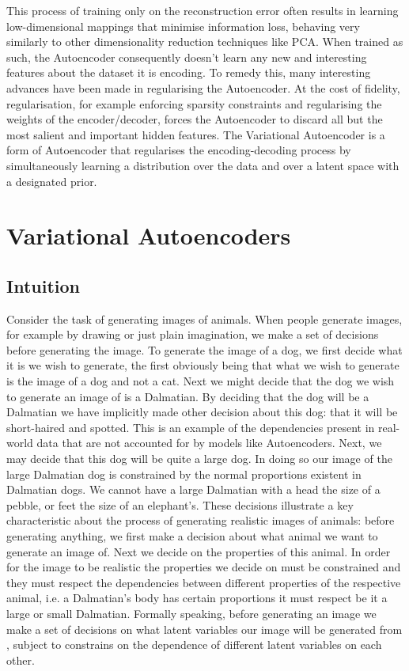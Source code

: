  This process of training only on the reconstruction error often results in learning low-dimensional mappings that minimise information loss, behaving very similarly to other dimensionality reduction techniques like PCA. When trained as such, the Autoencoder consequently doesn't learn any new and interesting features about the dataset it is encoding. To remedy this, many interesting advances have been made in regularising the Autoencoder. At the cost of fidelity, regularisation, for example enforcing sparsity constraints and regularising the weights of the encoder/decoder, forces the Autoencoder to discard all but the most salient and important hidden features. The Variational Autoencoder is a form of Autoencoder that regularises the encoding-decoding process by simultaneously learning a distribution over the data and over a latent space with a designated prior.
 
\section{Variational Autoencoders}

\subsection{Intuition} \label{vae_intuition}
Consider the task of generating images of animals. When people generate images, for example by drawing or just plain imagination, we make a set of decisions before generating the image. To generate the image of a dog, we first decide what it is we wish to generate, the first obviously being that what we wish to generate is the image of a dog and not a cat. Next we might decide that the dog we wish to generate an image of is a Dalmatian. By deciding that the dog will be a Dalmatian we have implicitly made other decision about this dog: that it will be short-haired and spotted. This is an example of the dependencies present in real-world data that are not accounted for by models like Autoencoders. Next, we may decide that this dog will be quite a large dog. In doing so our image of the large Dalmatian dog is constrained by the normal proportions existent in Dalmatian dogs. We cannot have a large Dalmatian with a head the size of a pebble, or feet the size of an elephant's. These decisions illustrate a key characteristic about the process of generating realistic images of animals: before generating anything, we first make a decision about what animal we want to generate an image of. Next we decide on the properties of this animal. In order for the image to be realistic the properties we decide on must be constrained and they must respect the dependencies between different properties of the respective animal, i.e. a Dalmatian's body has certain proportions it must respect be it a large or small Dalmatian. Formally speaking, before generating an image we make a set of decisions on what latent variables our image will be generated from \citep{doersch2016tutorial}, subject to constrains on the dependence of different latent variables on each other.\\

